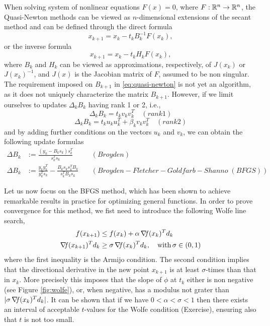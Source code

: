 \documentclass[10pt,a4paper]{article}
\begin{document}
When solving system of nonlinear equations $F(x) = 0$, where $F : \mathbb{R}^n \to \mathbb{R}^n$, the Quasi-Newton methods can be viewed as $n$-dimensional extensions of the secant method and can be defined through the direct formula
\begin{equation*}
	x_{k+1} = x_k - t_k B_k^{-1} F(x_k),
\end{equation*}
or the inverse formula
\begin{equation*}
	x_{k+1} = x_k - t_k H_k F(x_k),
\end{equation*}
where $B_k$ and $H_k$ can be viewed as approximations, respectively, of $J(x_k)$ or $J(x_k)^{-1}$, and $J(x)$ is the Jacobian matrix of $F$, assumed to be non singular.\\
The requirement imposed on $B_{k+1}$ in \eqref{eq:quasi-newton} is not yet an algorithm, as it does not uniquely characterize the matrix $B_{k+1}$. However, if we limit ourselves to updates $\Delta_k B_k$ having rank 1 or 2, i.e., 
$$\Delta_k B_k = t_k v_k v_k^T \quad (rank 1)$$
$$\Delta_k B_k = t_k u_k u_k^T + \beta_k v_k v_k^T \quad (rank 2)$$
and by adding further conditions on the vectors $u_k$ and $v_k$, we can obtain the following update formulas
\begin{align*}
	 \Delta B_k&:=\frac{(y_k - B_k s_k) s_k^T }{s_k^T s_k}\quad &(Broyden)\\
	 \Delta B_k&:=\frac{y_k y_k^T}{y_k^T s_k} - \frac{B_k s_k s_k^TB_k}{s_k^T B_k s_k}  \quad &(Broyden-Fletcher-Goldfarb-Shanno\;(BFGS))
\end{align*}

Let us now focus on the BFGS method, which has been shown to achieve remarkable results in practice for optimizing general functions. In order to prove convergence for this method, we fist need to introduce the following Wolfe line search, 
\begin{equation}\label{eq:wolfe}
	\begin{split}
		f(x_{k+1}) &\leq f(x_k) + \alpha \operatorname*{\mathit{\nabla \!f}}(x_k)^Td_k\\
		\operatorname*{\mathit{\nabla \!f}}(x_{k+1})^T d_k&\geq \sigma \operatorname*{\mathit{\nabla \!f}}(x_k)^Td_k, \quad \mathord{\mathrm{with }}\, \sigma\in(0,1)
	\end{split}
\end{equation}
where the first inequality is the Armijo condition. The second condition implies that the directional derivative in the new point $x_{k+1}$ is at least $\sigma$-times than that in $x_k$. More precisely this imposes that the slope of $\phi$ at $t_k$ either is non negative (see Figure \ref{fig:wolfe}), or, when negative, has a modulus not grater than $|\sigma \operatorname*{\mathit{\nabla \!f}}(x_k)^Td_k|$. It can be shown that if we have $0<\alpha<\sigma<1$ then there exists an interval of acceptable $t$-values for the Wolfe condition (Exercise), ensuring also that $t$ is not too small. 
\end{document}
